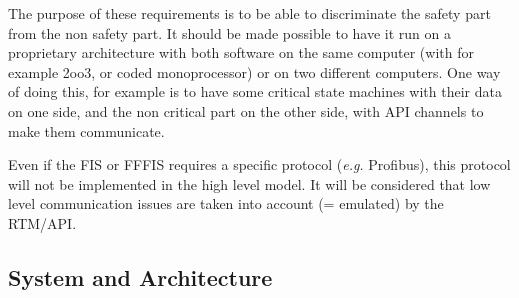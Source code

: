 \documentclass{template/openetcs_article}
\begin{document}


\begin{justif}
The purpose of these requirements is to be able to discriminate the safety part from the non 
safety part. It should be made possible to have it run on a proprietary architecture with both 
software on the same computer (with for example 2oo3, or coded monoprocessor) or on two 
different computers. One way of doing this, for example is to have some critical state 
machines with their data on one side, and the non critical part on the other side, with 
API channels to make them communicate.
\end{justif}


\begin{justif}
Even if the FIS or FFFIS requires a specific protocol (\emph{e.g.} Profibus), this protocol will not 
be implemented in the high level model. It will be considered that low level communication issues are
taken into account (= emulated) by the RTM/API.
\end{justif}



\subsection{System and Architecture}
\end{document}
